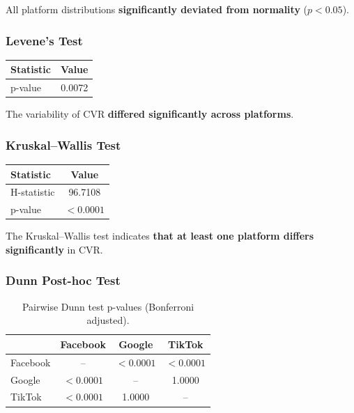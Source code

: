All platform distributions \textbf{significantly deviated from normality} ($p<0.05$).

\vspace{0.3cm}

\subsubsection{Levene's Test}

\begin{table}[H]
	\centering
	\begin{tabular}{lc}
		\toprule
		Statistic & Value \\
		\midrule
		p-value & 0.0072 \\
		\bottomrule
	\end{tabular}
\end{table}

The variability of CVR \textbf{differed significantly across platforms}.

\vspace{0.3cm}

\subsubsection{Kruskal--Wallis Test}

\begin{table}[H]
	\centering
	\begin{tabular}{lc}
		\toprule
		Statistic & Value \\
		\midrule
		H-statistic & 96.7108 \\
		p-value & $<0.0001$ \\
		\bottomrule
	\end{tabular}
\end{table}

The Kruskal--Wallis test indicates \textbf{that at least one platform differs significantly} in CVR.

\vspace{0.3cm}

\subsubsection{Dunn Post-hoc Test}

\begin{table}[H]
	\centering
	\caption{Pairwise Dunn test p-values (Bonferroni adjusted).}
	\begin{tabular}{lccc}
		\toprule
		& Facebook & Google & TikTok \\
		\midrule
		Facebook & -- & $<0.0001$ & $<0.0001$ \\
		Google & $<0.0001$ & -- & 1.0000 \\
		TikTok & $<0.0001$ & 1.0000 & -- \\
		\bottomrule
	\end{tabular}
\end{table}

